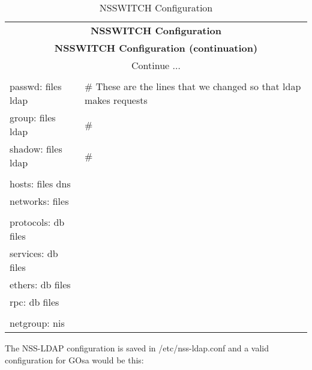 \begin{center}
\begin{longtable}{|ll|}\hline
\caption{NSSWITCH Configuration}\\
\hline \hline
\multicolumn{2}{|c|}{\textbf{NSSWITCH Configuration}}\\
\hline \hline
\endfirsthead
\hline \hline
\multicolumn{2}{|c|}{\textbf{NSSWITCH Configuration (continuation)}}\\
\hline \hline
\endhead
\hline
\multicolumn{2}{|c|}{Continue $\ldots$}\\
\hline
\endfoot
\hline
\multicolumn{2}{|c|}{\textbf{End}}\\
\hline
\endlastfoot
passwd:         files ldap & \# These are the lines that we changed so that ldap makes requests\\
group:          files ldap & \#\\
shadow:         files ldap & \#\\
 & \\
hosts:          files dns & \\
networks:       files & \\
 & \\
protocols:      db files & \\
services:       db files & \\
ethers:         db files & \\
rpc:            db files & \\
 & \\
netgroup:       nis & \\
\end{longtable}
\end{center}


\newpage
The NSS-LDAP configuration is saved in /etc/nss-ldap.conf and a valid configuration for GOsa would be this: 

